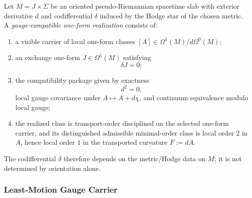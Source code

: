 \begin{definition}
\label{def:gauge-compatible-one-form-realization}
Let \(M=J\times\Sigma\) be an oriented pseudo-Riemannian spacetime slab with
exterior derivative \(d\) and codifferential \(\delta\) induced by the Hodge
star of the chosen metric. A
\emph{gauge-compatible one-form realization} consists of:
\begin{enumerate}[label=(\roman*),itemsep=0.2em]
\item a visible carrier of local one-form classes \([A]\in\Omega^1(M)/d\Omega^0(M)\);
\item an exchange one-form \(J\in\Omega^1(M)\) satisfying
      \[
      \delta J=0;
      \]
\item the compatibility package given by exactness
      \[
      d^2=0,
      \]
      local gauge covariance under \(A\mapsto A+d\chi\), and continuum
      equivalence modulo local gauge;
\item the realized class is transport-order disciplined on the selected
      one-form carrier, and its distinguished admissible minimal-order class
      is local order \(2\) in \(A\), hence local order \(1\) in the
      transported curvature \(F:=dA\).
\end{enumerate}
\end{definition}

The codifferential \(\delta\) therefore depends on the metric/Hodge data on
\(M\); it is not determined by orientation alone.

\subsubsection{Least-Motion Gauge Carrier}

